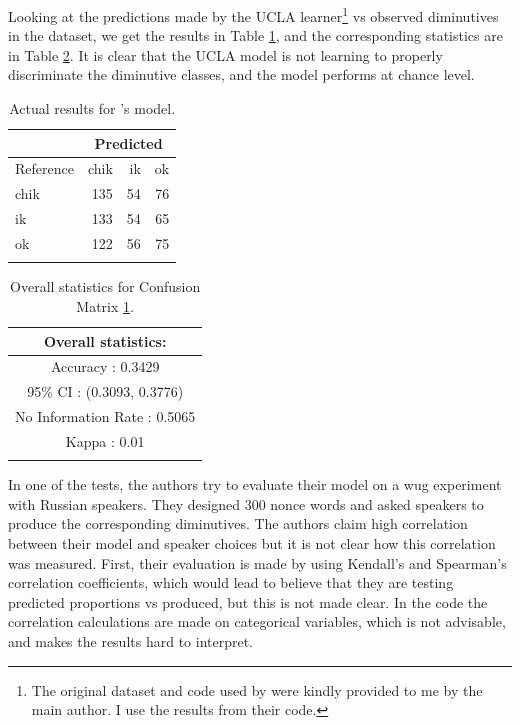 Looking at the predictions made by the UCLA learner\footnote{The original dataset and code used by \textcite{Gouskova.2015} were kindly provided to me by the main author. I use the results from their code.} vs observed diminutives in the dataset, we get the results in Table \ref{tab:test-gkn-model}, and the corresponding statistics are in Table \ref{tab:test-gkn-stats}. It is clear that the UCLA model is not learning to properly discriminate the diminutive classes, and the model performs at chance level.

\begin{table}[!htpb]
  \centering
  \begin{tabular}{lrrr}
    \lsptoprule
    & \multicolumn{3}{c}{Predicted} \\
    \midrule
    Reference & chik & ik & ok                \\
    chik      & 135  & 54 & 76                \\
    ik        & 133  & 54 & 65                \\
    ok        & 122  & 56 & 75                \\
    \lspbottomrule
  \end{tabular}
  \caption{Actual results for \textcite{Gouskova.2015}'s model.}\label{tab:test-gkn-model}
\end{table}

\begin{table}[!htpb]
  \centering
  \begin{tabular}{c}
    \lsptoprule
    Overall statistics:          \\
    \midrule
    Accuracy : 0.3429\\
    95\% CI : (0.3093, 0.3776)\\
    No Information Rate : 0.5065\\
    Kappa : 0.01\\
    \lspbottomrule
  \end{tabular}
  \caption{Overall statistics for Confusion Matrix \ref{tab:test-gkn-model}.}\label{tab:test-gkn-stats}
\end{table}

In one of the tests, the authors try to evaluate their model on a wug experiment with Russian speakers. They designed 300 nonce words and asked speakers to produce the corresponding diminutives. The authors claim high correlation between their model and speaker choices but it is not clear how this correlation was measured. First, their evaluation is made by using Kendall's and Spearman's correlation coefficients, which would lead to believe that they are testing predicted proportions vs produced, but this is not made clear. In the code the correlation calculations are made on categorical variables, which is not advisable, and makes the results hard to interpret.


